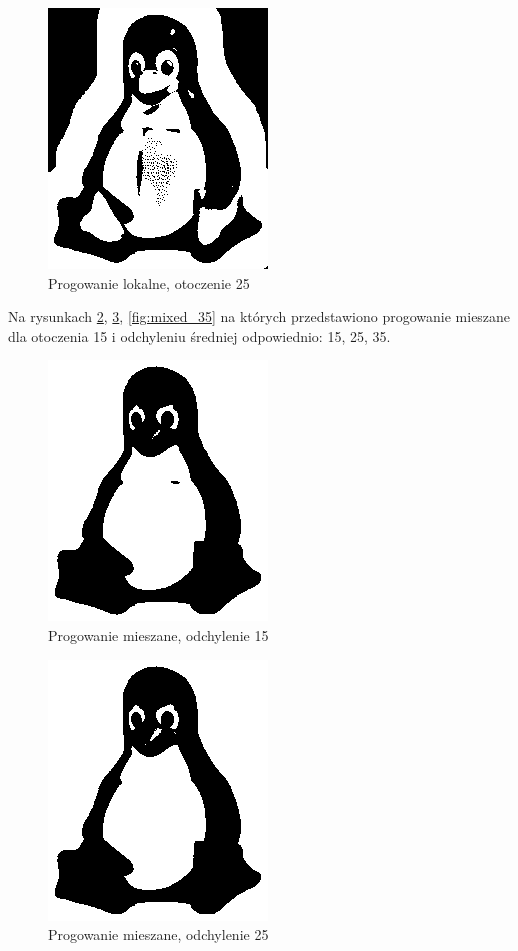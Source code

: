 \documentclass[12pt, a4paper]{article}
\begin{document}
\begin{figure}[p]
\includegraphics{local_25}
\caption{Progowanie lokalne, otoczenie 25}
\label{fig:local_25}
\end{figure}
Na rysunkach \ref{fig:mixed_15}, \ref{fig:mixed_25}, \ref{fig:mixed_35} na których przedstawiono progowanie mieszane dla otoczenia 15 i odchyleniu średniej odpowiednio: 15, 25, 35.\\
\begin{figure}[p]
\includegraphics{mixed_15}
\caption{Progowanie mieszane, odchylenie 15}
\label{fig:mixed_15}
\end{figure}
\begin{figure}[p]
\includegraphics{mixed_25}
\caption{Progowanie mieszane, odchylenie 25}
\label{fig:mixed_25}
\end{figure}
\end{document}
